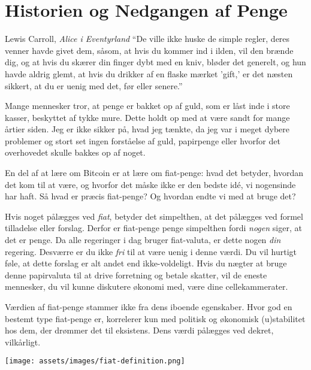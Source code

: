 \chapter{Historien og Nedgangen af Penge}
\label{les:12}

\begin{chapquote}{Lewis Carroll, \textit{Alice i Eventyrland}}
\enquote{De ville ikke huske de simple regler, deres venner havde givet dem, såsom, at hvis du kommer ind i ilden, vil den brænde dig, og at hvis du skærer din finger dybt med en kniv, bløder det generelt, og hun havde aldrig glemt, at hvis du drikker af en flaske mærket 'gift,' er det næsten sikkert, at du er uenig med det, før eller senere.}
\end{chapquote}

Mange mennesker tror, at penge er bakket op af guld, som er låst inde i store kasser, beskyttet af tykke mure. Dette holdt op med at være sandt for mange årtier siden. Jeg er ikke sikker på, hvad jeg tænkte, da jeg var i meget dybere problemer og stort set ingen forståelse af guld, papirpenge eller hvorfor det overhovedet skulle bakkes op af noget.

En del af at lære om Bitcoin er at lære om fiat-penge: hvad det betyder, hvordan det kom til at være, og hvorfor det måske ikke er den bedste idé, vi nogensinde har haft. Så hvad er præcis fiat-penge? Og hvordan endte vi med at bruge det?

Hvis noget pålægges ved \textit{fiat}, betyder det simpelthen, at det pålægges ved formel tilladelse eller forslag. Derfor er fiat-penge penge simpelthen fordi \textit{nogen} siger, at det er penge. Da alle regeringer i dag bruger fiat-valuta, er dette nogen \textit{din} regering. Desværre er du ikke \textit{fri} til at være uenig i denne værdi. Du vil hurtigt føle, at dette forslag er alt andet end ikke-voldeligt. Hvis du nægter at bruge denne papirvaluta til at drive forretning og betale skatter, vil de eneste mennesker, du vil kunne diskutere økonomi med, være dine cellekammerater.

Værdien af fiat-penge stammer ikke fra dens iboende egenskaber. Hvor god en bestemt type fiat-penge er, korrelerer kun med politisk og økonomisk (u)stabilitet hos dem, der drømmer det til eksistens. Dens værdi pålægges ved dekret, vilkårligt.

\begin{center}
  \centering
  \texttt{[image: assets/images/fiat-definition.png]}
  \label{fig:fiat-definition}
  \end{center}
  
